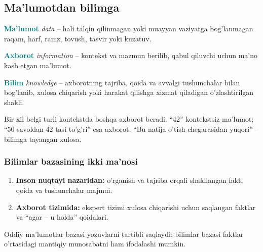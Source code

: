 \documentclass[11pt,a4paper,oneside]{book}
\newcommand{\term}[1]{\textbf{\textcolor{Teal}{#1}}\index{#1}}
\newcommand{\eng}[1]{\textit{\textcolor{Muted}{#1}}}
\begin{document}
\subsection{Ma'lumotdan bilimga}
\begin{definition}
\term{Ma'lumot} \eng{data} -- hali talqin qilinmagan yoki muayyan vaziyatga bog'lanmagan raqam, harf, ramz, tovush, tasvir yoki kuzatuv.
\end{definition}
\begin{definition}
\term{Axborot} \eng{information} -- kontekst va mazmun berilib, qabul qiluvchi uchun ma'no kasb etgan ma'lumot.
\end{definition}
\begin{definition}
\term{Bilim} \eng{knowledge} -- axborotning tajriba, qoida va avvalgi tushunchalar bilan bog'lanib, xulosa chiqarish yoki harakat qilishga xizmat qiladigan o'zlashtirilgan shakli.
\end{definition}

\begin{center}
\end{center}

\begin{attest}
Bir xil belgi turli kontekstda boshqa axborot beradi. ``42'' kontekstsiz ma'lumot; ``50 savoldan 42 tasi to'g'ri'' esa axborot. ``Bu natija o'tish chegarasidan yuqori'' -- bilimga tayangan xulosa.
\end{attest}

\subsubsection{Bilimlar bazasining ikki ma'nosi}
\begin{enumerate}
\item \textbf{Inson nuqtayi nazaridan:} o'rganish va tajriba orqali shakllangan fakt, qoida va tushunchalar majmui.
\item \textbf{Axborot tizimida:} ekspert tizimi xulosa chiqarishi uchun saqlangan faktlar va ``agar -- u holda'' qoidalari.
\end{enumerate}
Oddiy ma'lumotlar bazasi yozuvlarni tartibli saqlaydi; bilimlar bazasi faktlar o'rtasidagi mantiqiy munosabatni ham ifodalashi mumkin.
\end{document}

